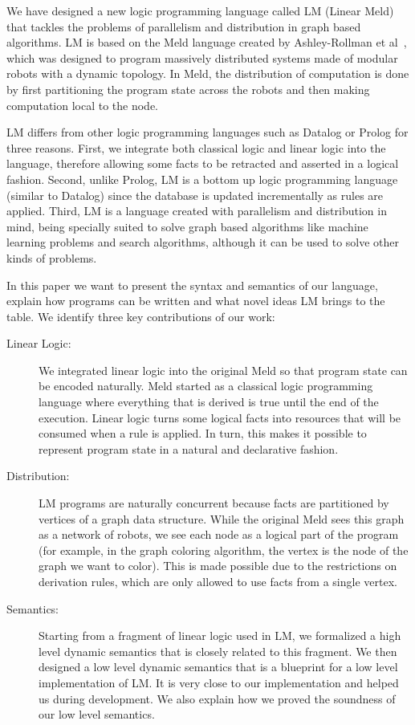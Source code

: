 
We have designed a new logic programming language called LM (Linear Meld) that tackles the problems
of parallelism and distribution in graph based algorithms.
LM is based on the Meld language created by Ashley-Rollman et
al~\cite{ashley-rollman-iclp09,ashley-rollman-derosa-iros07wksp}, which
was designed to program massively distributed systems made of modular robots with a dynamic topology.
In Meld, the distribution of computation is done by first partitioning the program state across the robots
and then making computation local to the node.

LM differs from other logic programming languages such as Datalog or Prolog for three reasons. First, we integrate both classical logic and linear logic into the language, therefore allowing some facts to be retracted and asserted in a logical fashion. Second, unlike Prolog, LM is a bottom up logic programming language (similar to Datalog) since the
database is updated incrementally as rules are applied. Third, LM is a language created with parallelism and
distribution in mind, being specially suited to solve graph based algorithms like machine learning problems and
search algorithms, although it can be used to solve other kinds of problems.

In this paper we want to present the syntax and semantics of our language, explain how programs can be written
and what novel ideas LM brings to the table. We identify three key contributions of our work:

\begin{description}
   \item[Linear Logic:] We integrated linear logic into the original Meld so that program state can be encoded naturally.
   Meld started as a classical logic programming language where everything that is derived is true until the end
   of the execution. Linear logic turns some logical facts into resources that will be consumed when a rule is applied. In turn, this makes it possible to represent program state in a natural and declarative fashion.
   \item[Distribution:] LM programs are naturally concurrent because facts are partitioned by vertices of a graph data structure. While the original Meld sees this graph as a network of robots, we see each node as a logical part of the program (for example, in the graph coloring algorithm, the vertex is the node of the graph we want to color). This is made possible due to the restrictions on derivation rules, which are only allowed to use facts from a single vertex.
   \item[Semantics:] Starting from a fragment of linear logic used in LM, we formalized a high level dynamic semantics that is closely related to this fragment.
   We then designed a low level dynamic semantics that is a blueprint for a low level implementation of LM. It is very
   close to our implementation and helped us during development. We also explain how we proved the soundness of our low level semantics.
\end{description}

